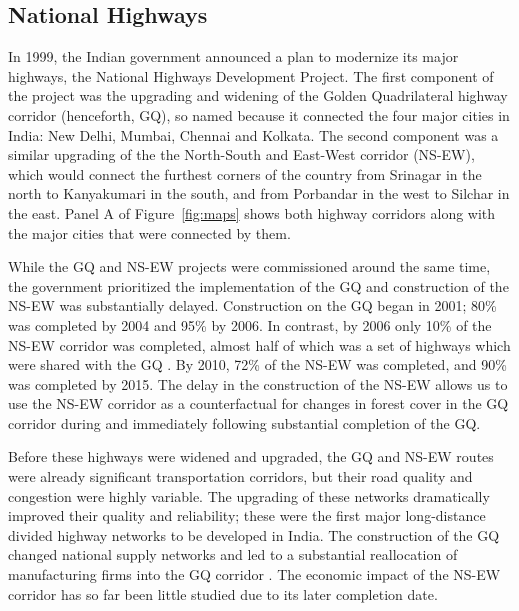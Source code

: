 \subsection{National Highways}

In 1999, the Indian government announced a plan to modernize its major
highways, the National Highways Development Project. The first
component of the project was the upgrading and widening of the Golden
Quadrilateral highway corridor (henceforth, GQ), so named because it
connected the four major cities in India: New Delhi, Mumbai, Chennai
and Kolkata. The second component was a similar upgrading of the the
North-South and East-West corridor (NS-EW), which would connect the
furthest corners of the country from Srinagar in the north to
Kanyakumari in the south, and from Porbandar in the west to Silchar in
the east. Panel A of Figure~\ref{fig:maps} shows both highway
corridors along with the major cities that were connected by them.

While the GQ and NS-EW projects were commissioned around the same
time, the government prioritized the implementation of the GQ and
construction of the NS-EW was substantially delayed. Construction on
the GQ began in 2001; 80\% was completed by 2004 and 95\% by 2006. In
contrast, by 2006 only 10\% of the NS-EW corridor was completed,
almost half of which was a set of highways which were shared with the
GQ \cite{GGK16}. By 2010, 72\% of the NS-EW was completed, and 90\%
was completed by 2015. The delay in the construction of the NS-EW
allows us to use the NS-EW corridor as a counterfactual for changes in
forest cover in the GQ corridor during and immediately following
substantial completion of the GQ.

Before these highways were widened and upgraded, the GQ and NS-EW
routes were already significant transportation corridors, but their
road quality and congestion were highly variable. The upgrading of
these networks dramatically improved their quality and reliability;
these were the first major long-distance divided highway networks to
be developed in India. The construction of the GQ changed national
supply networks and led to a substantial reallocation of manufacturing
firms into the GQ corridor \cite{SD12,GK16,GGK16}. The economic impact
of the NS-EW corridor has so far been little studied due to its later
completion date.
